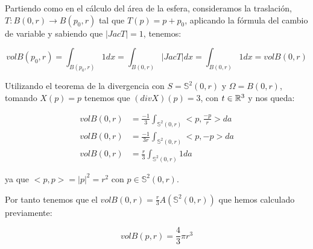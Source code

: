 \begin{remark}
Partiendo como en el cálculo del área de la esfera, consideramos la traslación, $T: B(0, r) \longrightarrow B(p_0, r)$ tal que $T(p) = p + p_0$, aplicando la fórmula del cambio de variable y sabiendo que $|JacT|=1$, tenemos:

\begin{equation*}
    vol B(p_0,r) = \int_{B(p_0,r)} 1 dx = \int_{B(0,r)} |JacT|dx = \int_{B(0,r)} 1dx = vol B(0,r)
\end{equation*}

Utilizando el teorema de la divergencia con $S=\mathbb{S}^2(0,r)$ y $\Omega=B(0,r)$, tomando $X(p)=p$ tenemos que $(div X)(p)=3$, con $t\in \mathbb{R}^3$ y nos queda:

\begin{align*}
    vol B(0,r) &= \frac{-1}{3} \int_{\mathbb{S}^2(0,r)} <p, \frac{-p}{r}>da \\
    vol B(0,r) &= \frac{-1}{3r} \int_{\mathbb{S}^2(0,r)} <p, -p>da \\
    vol B(0,r) &= \frac{r}{3} \int_{\mathbb{S}^2(0,r)} 1da
\end{align*}

ya que $<p,p> = |p|^2 = r^2$ con $p \in \mathbb{S}^2(0,r)$.

Por tanto tenemos que el $vol B(0,r) = \frac{r}{3}A(\mathbb{S}^2(0,r))$ que hemos calculado previamente:

\begin{equation*}
    vol B(p,r) = \frac{4}{3}\pi r^3
\end{equation*}
\end{remark}

